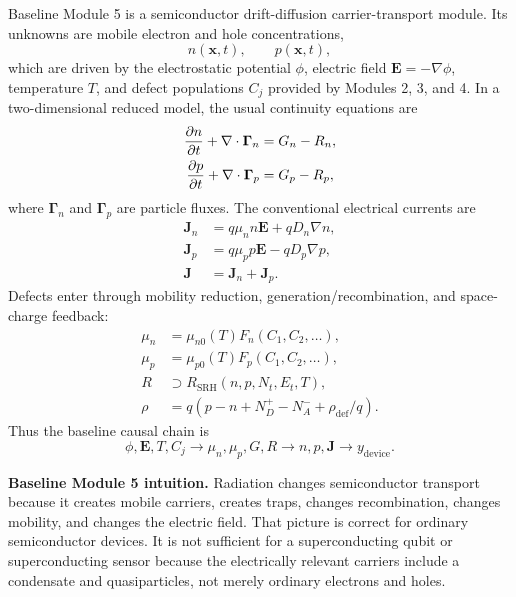\documentclass[11pt]{article}
\newcommand{\Evec}{\bm{E}}
\newcommand{\Jvec}{\bm{J}}
\newcommand{\x}{\bm{x}}
\newcommand{\phiE}{\phi}
\begin{document}
Baseline Module 5 is a semiconductor drift-diffusion carrier-transport module. Its unknowns are mobile electron and hole concentrations,
\begin{equation}
 n(\x,t),\qquad p(\x,t),
\end{equation}
which are driven by the electrostatic potential \(\phiE\), electric field \(\Evec=-\nabla\phiE\), temperature \(T\), and defect populations \(C_j\) provided by Modules 2, 3, and 4. In a two-dimensional reduced model, the usual continuity equations are
\begin{align}
\pdv{n}{t} + \nabla\cdot \bm{\Gamma}_n &= G_n-R_n, \\
\pdv{p}{t} + \nabla\cdot \bm{\Gamma}_p &= G_p-R_p,
\end{align}
where \(\bm{\Gamma}_n\) and \(\bm{\Gamma}_p\) are particle fluxes. The conventional electrical currents are
\begin{align}
 \Jvec_n &= q\mu_n n\Evec + qD_n\nabla n,\\
 \Jvec_p &= q\mu_p p\Evec - qD_p\nabla p,\\
 \Jvec &= \Jvec_n+\Jvec_p.
\end{align}
Defects enter through mobility reduction, generation/recombination, and space-charge feedback:
\begin{align}
\mu_n &= \mu_{n0}(T) F_n(C_1,C_2,\ldots),\\
\mu_p &= \mu_{p0}(T) F_p(C_1,C_2,\ldots),\\
R &\supset R_{\mathrm{SRH}}(n,p,N_t,E_t,T),\\
\rho &= q(p-n+N_D^+-N_A^-+\rho_{\mathrm{def}}/q).
\end{align}
Thus the baseline causal chain is
\begin{equation}
\boxed{\phiE,\Evec,T,C_j \longrightarrow \mu_n,\mu_p,G,R \longrightarrow n,p,\Jvec \longrightarrow y_{\mathrm{device}}.}
\end{equation}

\begin{physicsbox}
\textbf{Baseline Module 5 intuition.} Radiation changes semiconductor transport because it creates mobile carriers, creates traps, changes recombination, changes mobility, and changes the electric field. That picture is correct for ordinary semiconductor devices. It is not sufficient for a superconducting qubit or superconducting sensor because the electrically relevant carriers include a condensate and quasiparticles, not merely ordinary electrons and holes.
\end{physicsbox}
\end{document}
